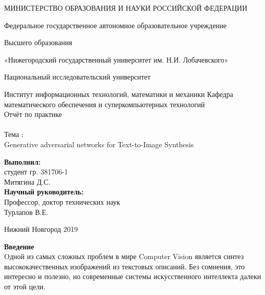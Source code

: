 \documentclass{article}
\begin{document}
    \begin{center} 
    \large МИНИСТЕРСТВО ОБРАЗОВАНИЯ И НАУКИ РОССИЙСКОЙ ФЕДЕРАЦИИ

Федеральное государственное автономное образовательное учреждение

Высшего образования

«Нижегородский государственный университет им. Н.И. Лобачевского»

Национальный исследовательский университет

Институт информационных технологий, математики и механики 
Кафедра математического обеспечения и суперкомпьютерных технологий\\[3.5cm] 
    
    \huge Отчёт по практике \\[0.6cm] %
    \\ 
    \huge{Тема :}\\[0.6cm]
    \large Generative adversarial networks for Text-to-Image Synthesis\\[7.7cm]
    
    
    \end{center} 
    
    \begin{flushright}
    \textbf{Выполнил:} \\
    студент гр. 381706-1 \\
    Митягина Д.С. \\
    \textbf{Научный руководитель:} \\
    Профессор, доктор технических наук\\
    Турлапов В.Е. \\
    [4.7cm]
    \end{flushright}
    
    
    
    \begin{center} 
    \large Нижний Новгород 2019
    \end{center} 
    
    \thispagestyle{empty}
    \newpage
      \begin{center}
      \end{center}
    \newpage
      \huge \textbf{Введение} \\[1.3cm]
      \large Oдной из самых сложных проблем в мире Computer Vision является синтез высококачественных изображений из текстовых описаний. Без сомнения, это интересно и полезно, но современные системы искусственного интеллекта далеки от этой цели.
\end{document}
